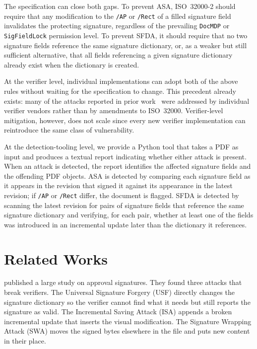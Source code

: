 \documentclass[12pt]{article}
\begin{document}
The specification can close both gaps. To prevent ASA, ISO~32000-2 should require that any modification to the \texttt{/AP} or \texttt{/Rect} of a filled signature field invalidates the protecting signature, regardless of the prevailing \texttt{DocMDP} or \texttt{SigFieldLock} permission level. To prevent SFDA, it should require that no two signature fields reference the same signature dictionary, or, as a weaker but still sufficient alternative, that all fields referencing a given signature dictionary already exist when the dictionary is created.

At the verifier level, individual implementations can adopt both of the above rules without waiting for the specification to change. This precedent already exists: many of the attacks reported in prior work~\cite{pdf-certification-attack,shadow-attacks,processing-dangerous-paths,one-trillion-dollar-refund,practical-decryption-exfiltration} were addressed by individual verifier vendors rather than by amendments to ISO~32000. Verifier-level mitigation, however, does not scale since every new verifier implementation can reintroduce the same class of vulnerability.

At the detection-tooling level, we provide a Python tool that takes a PDF as input and produces a textual report indicating whether either attack is present. When an attack is detected, the report identifies the affected signature fields and the offending PDF objects. ASA is detected by comparing each signature field as it appears in the revision that signed it against its appearance in the latest revision; if \texttt{/AP} or \texttt{/Rect} differ, the document is flagged. SFDA is detected by scanning the latest revision for pairs of signature fields that reference the same signature dictionary and verifying, for each pair, whether at least one of the fields was introduced in an incremental update later than the dictionary it references.

\section{Related Works} \label{sec:related-works}

\cite{one-trillion-dollar-refund} published a large study on approval signatures. They found three attacks that break verifiers. The Universal Signature Forgery (USF) directly changes the signature dictionary so the verifier cannot find what it needs but still reports the signature as valid. The Incremental Saving Attack (ISA) appends a broken incremental update that inserts the visual modification. The Signature Wrapping Attack (SWA) moves the signed bytes elsewhere in the file and puts new content in their place.
\end{document}
